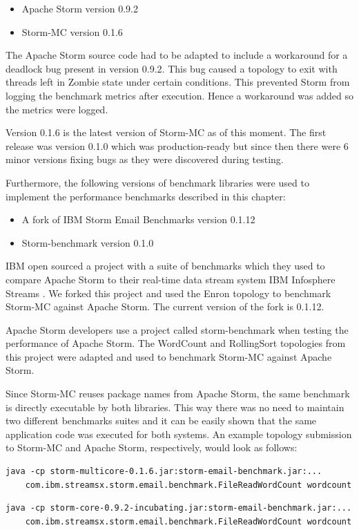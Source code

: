 \begin{itemize}
	\item Apache Storm version 0.9.2
	\item Storm-MC version 0.1.6
\end{itemize}

The Apache Storm source code had to be adapted to include a workaround for a deadlock bug present in version 0.9.2. This bug caused a topology to exit with threads left in Zombie state under certain conditions. This prevented Storm from logging the benchmark metrics after execution. Hence a workaround was added so the metrics were logged.

Version 0.1.6 is the latest version of Storm-MC as of this moment. The first release was version 0.1.0 which was production-ready but since then there were 6 minor versions fixing bugs as they were discovered during testing.

Furthermore, the following versions of benchmark libraries were used to implement the performance benchmarks described in this chapter:

\begin{itemize}
	\item A fork of IBM Storm Email Benchmarks version 0.1.12
	\item Storm-benchmark version 0.1.0
\end{itemize}

IBM open sourced a project with a suite of benchmarks which they used to compare Apache Storm to their real-time data stream system IBM Infosphere Streams \citep{InfoSphereStreams}. We forked this project and used the Enron topology to benchmark Storm-MC against Apache Storm. The current version of the fork is 0.1.12.

Apache Storm developers use a project called storm-benchmark when testing the performance of Apache Storm. The WordCount and RollingSort topologies from this project were adapted and used to benchmark Storm-MC against Apache Storm. 

Since Storm-MC reuses package names from Apache Storm, the same benchmark is directly executable by both libraries. This way there was no need to maintain two different benchmarks suites and it can be easily shown that the same application code was executed for both systems. An example topology submission to Storm-MC and Apache Storm, respectively, would look as follows:

\begin{verbatim}
java -cp storm-multicore-0.1.6.jar:storm-email-benchmark.jar:...
    com.ibm.streamsx.storm.email.benchmark.FileReadWordCount wordcount
\end{verbatim}
\begin{verbatim}
java -cp storm-core-0.9.2-incubating.jar:storm-email-benchmark.jar:...
    com.ibm.streamsx.storm.email.benchmark.FileReadWordCount wordcount
\end{verbatim}

